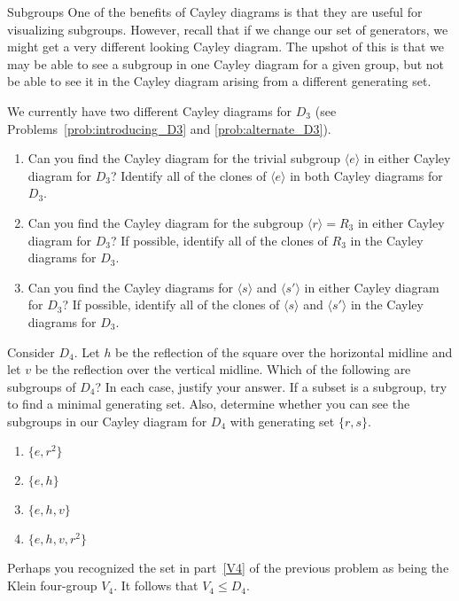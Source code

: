 \begin{section}{Subgroups}
One of the benefits of Cayley diagrams is that they are useful for visualizing subgroups.  However, recall that if we change our set of generators, we might get a very different looking Cayley diagram.  The upshot of this is that we may be able to see a subgroup in one Cayley diagram for a given group, but not be able to see it in the Cayley diagram arising from a different generating set.

\begin{problem}
We currently have two different Cayley diagrams for $D_3$ (see Problems~\ref{prob:introducing_D3} and \ref{prob:alternate_D3}).  
\begin{enumerate}[label=\rm{(\alph*)}]
\item Can you find the Cayley diagram for the trivial subgroup $\langle e\rangle$ in either Cayley diagram for $D_3$?  Identify all of the clones of $\langle e\rangle$ in both Cayley diagrams for $D_3$.
\item Can you find the Cayley diagram for the subgroup $\langle r\rangle =R_3$ in either Cayley diagram for $D_3$?  If possible, identify all of the clones of $R_3$ in the Cayley diagrams for $D_3$.
\item Can you find the Cayley diagrams for $\langle s\rangle$ and $\langle s'\rangle$ in either Cayley diagram for $D_3$?  If possible, identify all of the clones of $\langle s\rangle$ and $\langle s'\rangle$ in the Cayley diagrams for $D_3$.
\end{enumerate}
\end{problem}

\begin{problem}\label{prob:subgroups_D4}
Consider $D_4$.  Let $h$ be the reflection of the square over the horizontal midline and let $v$ be the reflection over the vertical midline.  Which of the following are subgroups of $D_4$?  In each case, justify your answer.  If a subset is a subgroup, try to find a minimal generating set.  Also, determine whether you can see the subgroups in our Cayley diagram for $D_4$ with generating set $\{r,s\}$.
\begin{enumerate}[label=\rm{(\alph*)}]
\item $\{e, r^2\}$
\item $\{e,h\}$
\item $\{e, h, v\}$
\item\label{V4} $\{e, h, v, r^2\}$
\end{enumerate}
\end{problem}

Perhaps you recognized the set in part~\ref{V4} of the previous problem as being the Klein four-group $V_4$. It follows that $V_4\leq D_4$.















\end{section}

